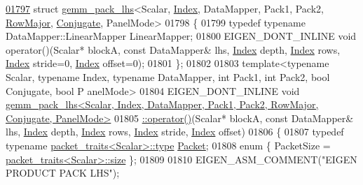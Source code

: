 \begin{DoxyCode}
\hyperlink{struct_eigen_1_1internal_1_1gemm__pack__lhs_3_01_scalar_00_01_index_00_01_data_mapper_00_01_packfbcb3001ebc1820bc72c8fc2e505297d}{01797} \textcolor{keyword}{struct }\hyperlink{struct_eigen_1_1internal_1_1gemm__pack__lhs}{gemm\_pack\_lhs}<Scalar, \hyperlink{namespace_eigen_a62e77e0933482dafde8fe197d9a2cfde}{Index}, DataMapper, Pack1, Pack2, 
      \hyperlink{group__enums_ggaacded1a18ae58b0f554751f6cdf9eb13acfcde9cd8677c5f7caf6bd603666aae3}{RowMajor}, \hyperlink{class_eigen_1_1_conjugate}{Conjugate}, PanelMode>
01798 \{
01799   \textcolor{keyword}{typedef} \textcolor{keyword}{typename} DataMapper::LinearMapper LinearMapper;
01800   EIGEN\_DONT\_INLINE \textcolor{keywordtype}{void} operator()(Scalar* blockA, \textcolor{keyword}{const} DataMapper& lhs, \hyperlink{namespace_eigen_a62e77e0933482dafde8fe197d9a2cfde}{Index} depth, 
      \hyperlink{namespace_eigen_a62e77e0933482dafde8fe197d9a2cfde}{Index} rows, \hyperlink{namespace_eigen_a62e77e0933482dafde8fe197d9a2cfde}{Index} stride=0, \hyperlink{namespace_eigen_a62e77e0933482dafde8fe197d9a2cfde}{Index} offset=0);
01801 \};
01802 
01803 \textcolor{keyword}{template}<\textcolor{keyword}{typename} Scalar, \textcolor{keyword}{typename} Index, \textcolor{keyword}{typename} DataMapper, \textcolor{keywordtype}{int} Pack1, \textcolor{keywordtype}{int} Pack2, \textcolor{keywordtype}{bool} Conjugate, \textcolor{keywordtype}{bool} P
      anelMode>
01804 EIGEN\_DONT\_INLINE \textcolor{keywordtype}{void} 
      \hyperlink{struct_eigen_1_1internal_1_1gemm__pack__lhs}{gemm\_pack\_lhs<Scalar, Index, DataMapper, Pack1, Pack2, RowMajor, Conjugate, PanelMode>}
01805 \hyperlink{struct_eigen_1_1internal_1_1gemm__pack__lhs}{  ::operator()}(Scalar* blockA, \textcolor{keyword}{const} DataMapper& lhs, \hyperlink{namespace_eigen_a62e77e0933482dafde8fe197d9a2cfde}{Index} depth, 
      \hyperlink{namespace_eigen_a62e77e0933482dafde8fe197d9a2cfde}{Index} rows, \hyperlink{namespace_eigen_a62e77e0933482dafde8fe197d9a2cfde}{Index} stride, \hyperlink{namespace_eigen_a62e77e0933482dafde8fe197d9a2cfde}{Index} offset)
01806 \{
01807   \textcolor{keyword}{typedef} \textcolor{keyword}{typename} \hyperlink{struct_eigen_1_1internal_1_1packet__traits}{packet\_traits<Scalar>::type} \hyperlink{union_eigen_1_1internal_1_1_packet}{Packet};
01808   \textcolor{keyword}{enum} \{ PacketSize = \hyperlink{struct_eigen_1_1internal_1_1packet__traits}{packet\_traits<Scalar>::size} \};
01809 
01810   EIGEN\_ASM\_COMMENT(\textcolor{stringliteral}{"EIGEN PRODUCT PACK LHS"});

\end{DoxyCode}
